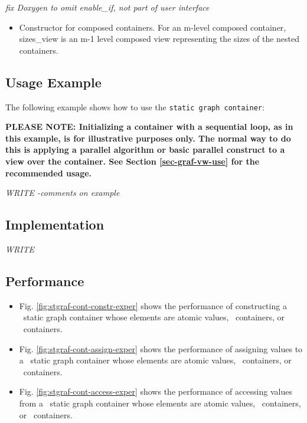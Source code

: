 \vspace{0.4cm} \emph{fix Doxygen to omit enable\_if, not part of user interface}

\begin{itemize}
\item
Constructor for composed containers. For an m-level composed container, sizes\_view is an m-1 level composed view representing the sizes of the nested containers. 
\end{itemize}



\subsection{Usage Example} \label{sec-stgraf-cont-use}

The following example shows how to use the \texttt{static graph container}:


\textbf{PLEASE NOTE: 
Initializing a container with a sequential loop, as in this example,
is for illustrative purposes only.
The normal way to do this is applying a parallel algorithm or 
basic parallel construct to a view over the container.  See Section
\ref{sec-graf-vw-use}
for the recommended usage.
}

\vspace{0.4cm} \textit{WRITE -comments on example}

\subsection{Implementation} \label{sec-stgraf-cont-impl}

\textit{WRITE}

\subsection{Performance} \label{sec-stgraf-cont-perf}

\begin{itemize}
\item
Fig. \ref{fig:stgraf-cont-constr-exper}
shows the performance of constructing a \stapl\ static graph container
whose elements are atomic values, \stl\ containers, or \stapl\ containers.
\item
Fig. \ref{fig:stgraf-cont-assign-exper}
shows the performance of assigning values to a \stapl\ static graph container
whose elements are atomic values, \stl\ containers, or \stapl\ containers.
\item
Fig. \ref{fig:stgraf-cont-access-exper}
shows the performance of accessing values from a \stapl\ static graph container
whose elements are atomic values, \stl\ containers, or \stapl\ containers.
\end{itemize}

